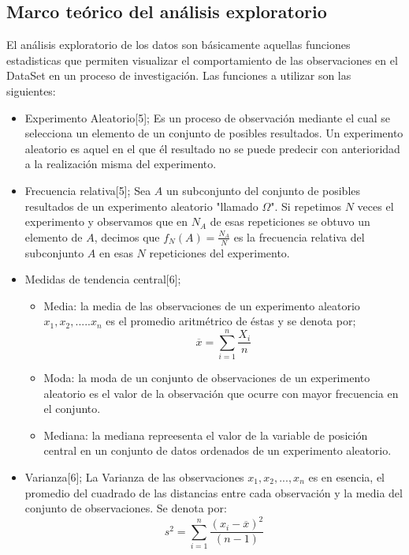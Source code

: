   
  \subsection{Marco teórico del análisis exploratorio}
  
  El análisis exploratorio de los datos son básicamente aquellas funciones estadisticas que permiten visualizar el comportamiento de las observaciones en el DataSet en un proceso de investigación. Las funciones a utilizar son las siguientes: 
  \begin{itemize}
  	\item Experimento Aleatorio[5]; Es un proceso de observación mediante el cual se selecciona un elemento de un conjunto de posibles resultados. Un experimento aleatorio es aquel en el que él resultado no se puede predecir con anterioridad a la realización misma del experimento. 
  	
   \item Frecuencia relativa[5]; Sea $A$ un subconjunto del conjunto de posibles resultados de un experimento aleatorio "llamado $\Omega$". Si repetimos $N$ veces el experimento y observamos que en $N_{A}$ de esas repeticiones se obtuvo un elemento de $A$, decimos que $f_{N}(A)=\frac{N_{A}}{N}$ es la frecuencia relativa del subconjunto $A$ en esas $N$  repeticiones del experimento.

    \item Medidas de tendencia central[6]; 
	   \begin{itemize}
		 	\item Media: la media de las observaciones de un experimento aleatorio $x_{1},x_{2},.....x_{n}$ es el promedio aritm\'etrico de \'estas y se denota por;
		 	$$\overline{x}=\sum_{i=1}^{n} \frac{X_{i}}{n}$$ 
		 	\item Moda: la moda de un conjunto de observaciones de un experimento aleatorio es el valor de la observaci\'on que ocurre con mayor frecuencia en el conjunto.
		 	\item Mediana: la mediana repreesenta el valor de la variable de posición central en un conjunto de datos ordenados de un experimento aleatorio.
		 \end{itemize}
 
	 \item Varianza[6]; La Varianza de las observaciones $x_{1},x_{2},...,x_{n}$ es en esencia, el promedio del cuadrado de las distancias entre cada observaci\'on y la media del conjunto de observaciones. Se denota por:
	 $$s^{2}=\sum_{i=1}^{n} \frac{ \left( x_{i}-\overline{x}\right)^{2}}{\left(n-1 \right) } $$ 
 

\end{itemize}
